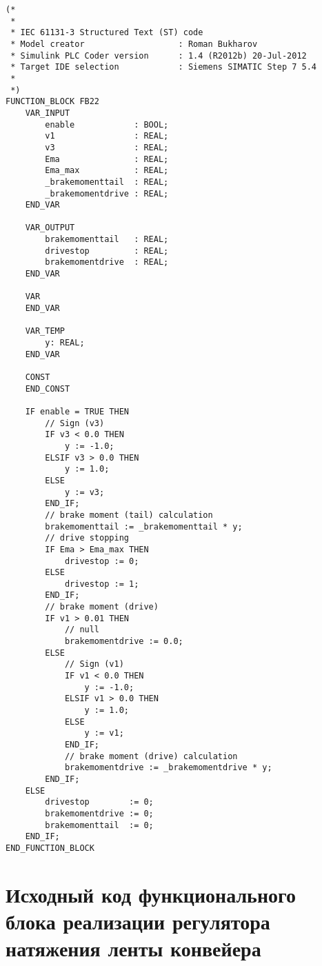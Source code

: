 \begin{verbatim}
(*
 *
 * IEC 61131-3 Structured Text (ST) code
 * Model creator                   : Roman Bukharov
 * Simulink PLC Coder version      : 1.4 (R2012b) 20-Jul-2012
 * Target IDE selection            : Siemens SIMATIC Step 7 5.4
 *
 *)
FUNCTION_BLOCK FB22
    VAR_INPUT
        enable            : BOOL;
        v1                : REAL;
        v3                : REAL;
        Ema               : REAL;
        Ema_max           : REAL;
        _brakemomenttail  : REAL;
        _brakemomentdrive : REAL;
    END_VAR
    
    VAR_OUTPUT
        brakemomenttail   : REAL;
        drivestop         : REAL;
        brakemomentdrive  : REAL;
    END_VAR
    
    VAR
    END_VAR
    
    VAR_TEMP
        y: REAL;
    END_VAR
    
    CONST 
    END_CONST    
    
    IF enable = TRUE THEN
        // Sign (v3)
        IF v3 < 0.0 THEN 
            y := -1.0;
        ELSIF v3 > 0.0 THEN 
            y := 1.0;
        ELSE 
            y := v3;
        END_IF;
        // brake moment (tail) calculation
        brakemomenttail := _brakemomenttail * y;        
        // drive stopping
        IF Ema > Ema_max THEN
            drivestop := 0;
        ELSE 
            drivestop := 1;
        END_IF;  
        // brake moment (drive)
        IF v1 > 0.01 THEN 
            // null
            brakemomentdrive := 0.0;
        ELSE 
            // Sign (v1)
            IF v1 < 0.0 THEN 
                y := -1.0;
            ELSIF v1 > 0.0 THEN 
                y := 1.0;
            ELSE 
                y := v1;
            END_IF;
            // brake moment (drive) calculation
            brakemomentdrive := _brakemomentdrive * y;
        END_IF;       
    ELSE
        drivestop        := 0;
        brakemomentdrive := 0;
        brakemomenttail  := 0;
    END_IF;
END_FUNCTION_BLOCK
\end{verbatim}

\section{Исходный код функционального блока реализации регулятора натяжения ленты конвейера} \label{AppendixB4}


